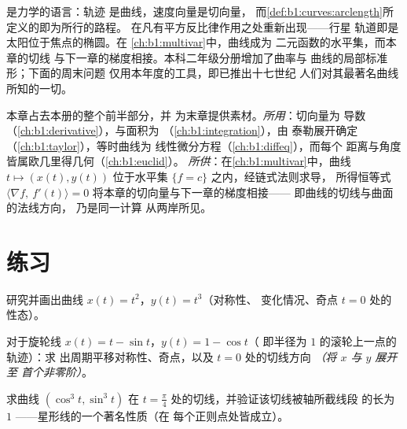 \begin{remark}[这些曲线的用途]
\label{rem:b1:curves:whereused}
是力学的语言：轨迹
是曲线，速度向量是切向量，
而\cref{def:b1:curves:arclength}所定义的即为所行的路程。
在凡有平方反比律作用之处重新出现——行星
轨道即是太阳位于焦点的椭圆。在
\cref{ch:b1:multivar}中，曲线成为
二元函数的水平集，而本章的切线
与下一章的梯度相接。本科二年级分册增加了曲率与
曲线的局部标准形；下面的周末问题
仅用本年度的工具，即已推出十七世纪
人们对其最著名曲线所知的一切。
\end{remark}

\begin{remark}[第 3 册内的几种视角]
\label{rem:b1:curves:perspectives}
本章占去本册的整个前半部分，并
为末章提供素材。\emph{所用}：切向量为
导数（\cref{ch:b1:derivative}），与面积为
（\cref{ch:b1:integration}），由
泰勒展开确定（\cref{ch:b1:taylor}），等时曲线为
线性微分方程（\cref{ch:b1:diffeq}），而每个
距离与角度皆属欧几里得几何（\cref{ch:b1:euclid}）。
\emph{所供}：在\cref{ch:b1:multivar}中，曲线 $t \mapsto (x(t),
y(t))$ 位于水平集 $\{f = c\}$ 之内，经链式法则求导，
所得恒等式 $\langle \nabla f,\
f'(t)\rangle = 0$ 将本章的切向量与下一章的梯度相接——
即曲线的切线与曲面的法线方向，
乃是同一计算
从两岸所见。
\end{remark}

\section{练习}

\begin{exercise}[$\star$]\label{exo:b1:curves:1}
研究并画出曲线 $x(t) = t^2$，$y(t) = t^3$（对称性、
变化情况、奇点 $t = 0$ 处的性态）。
\end{exercise}

\begin{exercise}[$\star$]\label{exo:b1:curves:2}
对于旋轮线 $x(t) = t - \sin t$，$y(t) = 1 - \cos t$（
即半径为 $1$ 的滚轮上一点的轨迹）：求
出周期平移对称性、奇点，以及
$t = 0$ 处的切线方向 \emph{（将 $x$ 与 $y$ 展开至
首个非零阶）}。
\end{exercise}

\begin{exercise}[$\star$]\label{exo:b1:curves:3}
求曲线 $(\cos^3 t, \sin^3 t)$ 在 $t =
\frac\pi4$ 处的切线，并验证该切线被轴所截线段
的长为 $1$ ——星形线的一个著名性质（在
每个正则点处皆成立）。
\end{exercise}

